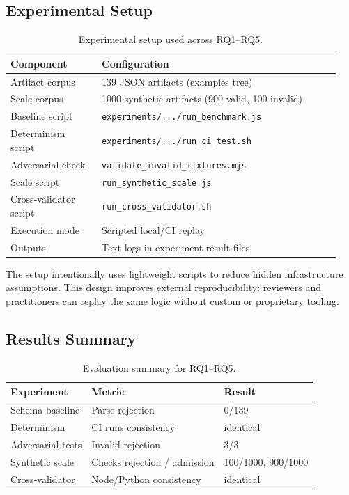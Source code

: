 \documentclass[10pt,conference]{IEEEtran}
\begin{document}
\subsection{Experimental Setup}

\begin{table}[t]
\centering
\caption{Experimental setup used across RQ1--RQ5.}
\begin{tabular}{@{}p{0.26\linewidth}p{0.68\linewidth}@{}}
\toprule
Component & Configuration \\
\midrule
Artifact corpus & 139 JSON artifacts (examples tree) \\
Scale corpus & 1000 synthetic artifacts (900 valid, 100 invalid) \\
Baseline script & \texttt{experiments/.../run\_benchmark.js} \\
Determinism script & \texttt{experiments/.../run\_ci\_test.sh} \\
Adversarial check & \texttt{validate\_invalid\_fixtures.mjs} \\
Scale script & \texttt{run\_synthetic\_scale.js} \\
Cross-validator script & \texttt{run\_cross\_validator.sh} \\
Execution mode & Scripted local/CI replay \\
Outputs & Text logs in experiment result files \\
\bottomrule
\end{tabular}
\end{table}

The setup intentionally uses lightweight scripts to reduce hidden
infrastructure assumptions. This design improves external reproducibility:
reviewers and practitioners can replay the same logic without custom
or proprietary tooling.

\subsection{Results Summary}

\begin{table}[t]
\centering
\caption{Evaluation summary for RQ1--RQ5.}
\begin{tabular}{lll}
\toprule
Experiment & Metric & Result \\
\midrule
Schema baseline & Parse rejection & 0/139 \\
Determinism & CI runs consistency & identical \\
Adversarial tests & Invalid rejection & 3/3 \\
Synthetic scale & Checks rejection / admission & 100/1000, 900/1000 \\
Cross-validator & Node/Python consistency & identical \\
\bottomrule
\end{tabular}
\end{table}
\end{document}
